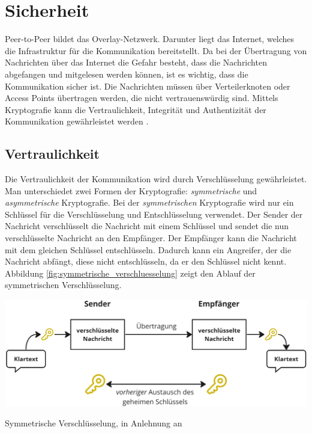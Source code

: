 \section{Sicherheit}
\label{sec:sicherheit_basics}

Peer-to-Peer bildet das Overlay-Netzwerk. Darunter liegt das Internet, welches die Infrastruktur für die Kommunikation bereitstellt. Da bei der Übertragung von Nachrichten über das Internet die Gefahr besteht, dass die Nachrichten abgefangen und mitgelesen werden können, ist es wichtig, dass die Kommunikation sicher ist. Die Nachrichten müssen über Verteilerknoten oder Access Points übertragen werden, die nicht vertrauenswürdig sind. Mittels Kryptografie kann die Vertraulichkeit, Integrität und Authentizität der Kommunikation gewährleistet werden \Parencite[S. 7]{Hellmann_IT-Sicherheit}.


\subsection{Vertraulichkeit}
\label{subsec:vertraulichkeit_basics}

Die Vertraulichkeit der Kommunikation wird durch Verschlüsselung gewährleistet. Man unterschiedet zwei Formen der Kryptografie: \textit{symmetrische} und \textit{asymmetrische} Kryptografie. Bei der \textit{symmetrischen} Kryptografie wird nur ein Schlüssel für die Verschlüsselung und Entschlüsselung verwendet. Der Sender der Nachricht verschlüsselt die Nachricht mit einem Schlüssel und sendet die nun verschlüsselte Nachricht an den Empfänger. Der Empfänger kann die Nachricht mit dem gleichen Schlüssel entschlüsseln. Dadurch kann ein Angreifer, der die Nachricht abfängt, diese nicht entschlüsseln, da er den Schlüssel nicht kennt. Abbildung \ref{fig:symmetrische_verschluesselung} zeigt den Ablauf der symmetrischen Verschlüsselung.

\begin{center}
    \captionsetup{type=figure}
    \includegraphics[width=1\linewidth]{images/symmetric_encryption.png}
    \caption{Symmetrische Verschlüsselung, in Anlehnung an \cite{ElektronikKompendium_symmetrischeVerschluesselung}}
    \label{fig:symmetrische_verschluesselung}
\end{center}


